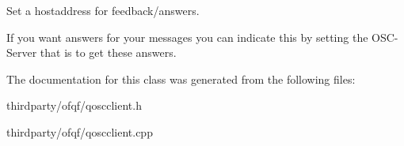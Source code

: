 Set a hostaddress for feedback/answers. 

If you want answers for your messages you can indicate this by setting the O\+S\+C-\/\+Server that is to get these answers. 

The documentation for this class was generated from the following files\+:\begin{DoxyCompactItemize}
\item 
thirdparty/ofqf/qoscclient.\+h\item 
thirdparty/ofqf/qoscclient.\+cpp\end{DoxyCompactItemize}
